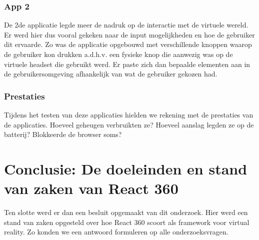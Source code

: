 \subsubsection{App 2}
De 2de applicatie legde meer de nadruk op de interactie met de virtuele wereld. Er werd hier dus vooral gekeken naar de input mogelijkheden en hoe de gebruiker dit ervaarde. Zo was de applicatie opgebouwd met verschillende knoppen waarop de gebruiker kon drukken a.d.h.v. een fysieke knop die aanwezig was op de virtuele headset die gebruikt werd. Er paste zich dan bepaalde elementen aan in de gebruikersomgeving afhankelijk van wat de gebruiker gekozen had.

\subsubsection{Prestaties}
Tijdens het testen van deze applicaties hielden we rekening met de prestaties van de applicaties. Hoeveel geheugen verbruikten ze? Hoeveel aanslag legden ze op de batterij? Blokkeerde de browser soms?

\section{Conclusie: De doeleinden en stand van zaken van React 360}
\label{sec:doeleinden-reactvr}
Ten slotte werd er dan een besluit opgemaakt van dit onderzoek. Hier werd een stand van zaken opgesteld over hoe React 360 scoort als framework voor virtual reality. Zo konden we een antwoord formuleren op alle onderzoeksvragen.



